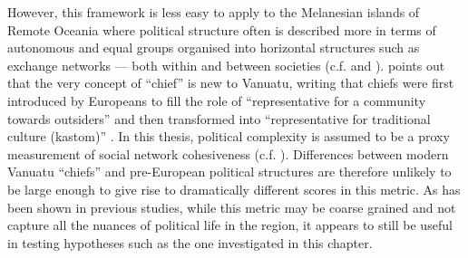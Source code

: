 \documentclass[a4paper,10pt]{article} %
\begin{document}
However, this framework is less easy to apply to the Melanesian islands of Remote Oceania where political structure often is described more in terms of autonomous and equal groups organised into horizontal structures such as exchange networks --- both within and between societies (c.f. \citet{bonnemaison1996graded} and \citet{huffman1996trading}). \citet{bolton1998chief} points out that the very concept of ``chief'' is new to Vanuatu, writing that chiefs were first introduced by Europeans to fill the role of ``representative for a community towards outsiders'' and then transformed into ``representative for traditional culture (kastom)'' \citep[185]{bolton1998chief}. In this thesis, political complexity is assumed to be a proxy measurement of social network cohesiveness (c.f. \citet{grace_1992_aberrant}). Differences between modern Vanuatu ``chiefs'' and pre-European political structures are therefore unlikely to be large enough to give rise to dramatically different scores in this metric. As has been shown in previous studies, while this metric may be coarse grained and not capture all the nuances of political life in the region, it appears to still be useful in testing hypotheses such as the one investigated in this chapter.



\end{document}
